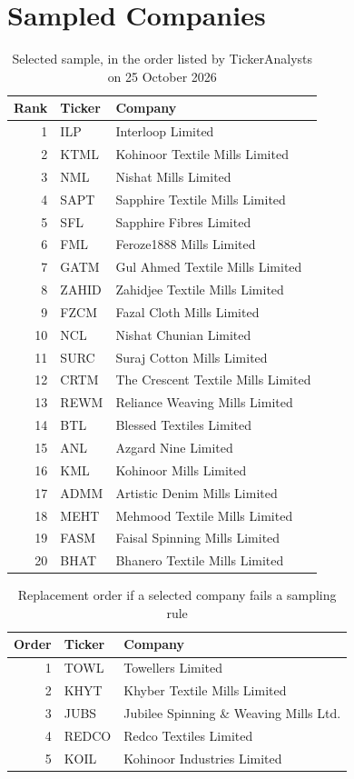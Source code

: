 \chapter{Sampled Companies}
\label{app:companies}

\begin{table}[ht]
  \centering
  \caption{Selected sample, in the order listed by TickerAnalysts on 25 October 2026}
  \label{tab:sampled}
  \small
  \begin{tabular}{@{}rll@{}}
    \toprule
    Rank & Ticker & Company \\
    \midrule
    1 & ILP & Interloop Limited \\
    2 & KTML & Kohinoor Textile Mills Limited \\
    3 & NML & Nishat Mills Limited \\
    4 & SAPT & Sapphire Textile Mills Limited \\
    5 & SFL & Sapphire Fibres Limited \\
    6 & FML & Feroze1888 Mills Limited \\
    7 & GATM & Gul Ahmed Textile Mills Limited \\
    8 & ZAHID & Zahidjee Textile Mills Limited \\
    9 & FZCM & Fazal Cloth Mills Limited \\
    10 & NCL & Nishat Chunian Limited \\
    11 & SURC & Suraj Cotton Mills Limited \\
    12 & CRTM & The Crescent Textile Mills Limited \\
    13 & REWM & Reliance Weaving Mills Limited \\
    14 & BTL & Blessed Textiles Limited \\
    15 & ANL & Azgard Nine Limited \\
    16 & KML & Kohinoor Mills Limited \\
    17 & ADMM & Artistic Denim Mills Limited \\
    18 & MEHT & Mehmood Textile Mills Limited \\
    19 & FASM & Faisal Spinning Mills Limited \\
    20 & BHAT & Bhanero Textile Mills Limited \\
    \bottomrule
  \end{tabular}
\end{table}

\begin{table}[ht]
  \centering
  \caption{Replacement order if a selected company fails a sampling rule}
  \label{tab:replacements}
  \small
  \begin{tabular}{@{}rll@{}}
    \toprule
    Order & Ticker & Company \\
    \midrule
    1 & TOWL & Towellers Limited \\
    2 & KHYT & Khyber Textile Mills Limited \\
    3 & JUBS & Jubilee Spinning \& Weaving Mills Ltd. \\
    4 & REDCO & Redco Textiles Limited \\
    5 & KOIL & Kohinoor Industries Limited \\
    \bottomrule
  \end{tabular}
\end{table}

